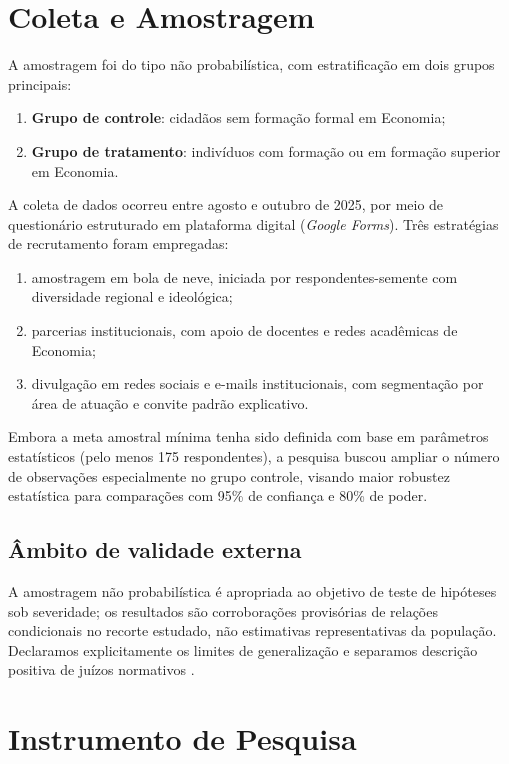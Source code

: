 \section{Coleta e Amostragem}

A amostragem foi do tipo não probabilística, com estratificação em dois grupos principais:
\begin{enumerate}[label=\alph*)]
    \item \textbf{Grupo de controle}: cidadãos sem formação formal em Economia;
    \item \textbf{Grupo de tratamento}: indivíduos com formação ou em formação superior em Economia.
\end{enumerate}

A coleta de dados ocorreu entre agosto e outubro de 2025, por meio de questionário estruturado em plataforma digital (\textit{Google Forms}). Três estratégias de recrutamento foram empregadas:

\begin{enumerate}[label=\alph*)]
    \item amostragem em bola de neve, iniciada por respondentes-semente com diversidade regional e ideológica;
    \item parcerias institucionais, com apoio de docentes e redes acadêmicas de Economia;
    \item divulgação em redes sociais e e-mails institucionais, com segmentação por área de atuação e convite padrão explicativo.
\end{enumerate}

Embora a meta amostral mínima tenha sido definida com base em parâmetros estatísticos (pelo menos 175 respondentes), a pesquisa buscou ampliar o número de observações especialmente no grupo controle, visando maior robustez estatística para comparações com 95\% de confiança e 80\% de poder.

\subsection{Âmbito de validade externa}
A amostragem não probabilística é apropriada ao objetivo de teste de hipóteses sob severidade; os resultados são corroborações provisórias de relações condicionais no recorte estudado, não estimativas representativas da população. Declaramos explicitamente os limites de generalização e separamos descrição positiva de juízos normativos \cite{hausman2008}.


\section{Instrumento de Pesquisa}

